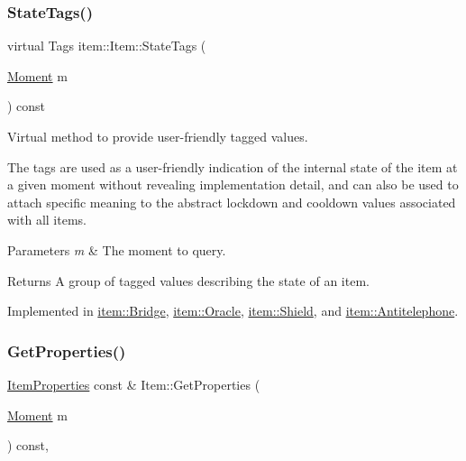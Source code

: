 \mbox{\label{classitem_1_1_item_acc560ac68be4f5781cd90cddfd602942}} 
\subsubsection{\texorpdfstring{State\+Tags()}{StateTags()}}
{\footnotesize\ttfamily virtual Tags item\+::\+Item\+::\+State\+Tags (\begin{DoxyParamCaption}\item[{\hyperlink{classtimeplane_1_1_moment}{Moment}}]{m }\end{DoxyParamCaption}) const\hspace{0.3cm}{\ttfamily [pure virtual]}}



Virtual method to provide user-\/friendly tagged values. 

The tags are used as a user-\/friendly indication of the internal state of the item at a given moment without revealing implementation detail, and can also be used to attach specific meaning to the abstract lockdown and cooldown values associated with all items. 
\begin{DoxyParams}{Parameters}
{\em m} & The moment to query. \\
\hline
\end{DoxyParams}
\begin{DoxyReturn}{Returns}
A group of tagged values describing the state of an item. 
\end{DoxyReturn}


Implemented in \hyperlink{classitem_1_1_bridge_af49adc6bbaf4788cce2b4cbf8d895865}{item\+::\+Bridge}, \hyperlink{classitem_1_1_oracle_a61b1924335a4c4443a78ee75f9935b14}{item\+::\+Oracle}, \hyperlink{classitem_1_1_shield_a91b92d4e1fca7015b75142d43f43e80e}{item\+::\+Shield}, and \hyperlink{classitem_1_1_antitelephone_a0322847417981b9acd4b323c35e728f0}{item\+::\+Antitelephone}.

\mbox{\label{classitem_1_1_item_a23790dceafc9e3f8950f69380cc4c4aa}} 
\subsubsection{\texorpdfstring{Get\+Properties()}{GetProperties()}}
{\footnotesize\ttfamily \hyperlink{classitem_1_1_item_properties}{Item\+Properties} const  \& Item\+::\+Get\+Properties (\begin{DoxyParamCaption}\item[{\hyperlink{classtimeplane_1_1_moment}{Moment}}]{m }\end{DoxyParamCaption}) const\hspace{0.3cm}{\ttfamily [inline]}, {\ttfamily [protected]}}



